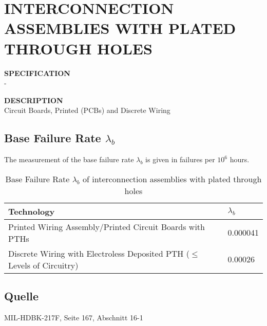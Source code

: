 \section{INTERCONNECTION ASSEMBLIES WITH PLATED THROUGH HOLES}

\begin{minipage}[t]{0.29\textwidth}
    \textbf{SPECIFICATION}\\
    -
\end{minipage}
\begin{minipage}[t]{0.7\textwidth}
    \textbf{DESCRIPTION}\\
    Circuit Boards, Printed (PCBs) and Discrete Wiring
\end{minipage}

\subsection{Base Failure Rate $\lambda_b$}
The measurement of the base failure rate $\lambda_b$ is given in failures per $10^6$ hours.
\begin{table}[ht]
{\centering

\begin{tabular}{|p{7cm}|p{2cm}|}
    \hline
    \textbf{Technology} & \textbf{$\lambda_b$} \\
    \hline
    Printed Wiring Assembly/Printed Circuit Boards with PTHs & 0.000041 \\
    \hline
    Discrete Wiring with Electroless Deposited PTH ($\le$ Levels of Circuitry) & 0.00026 \\
    \hline
\end{tabular}

\caption{Base Failure Rate $\lambda_b$ of interconnection assemblies with plated through holes}

\label{tab:bfr_interconnection_assemblies_with_plated_through_holes}
\par}
\end{table}
\subsection*{Quelle}
MIL-HDBK-217F, Seite 167, Abschnitt 16-1